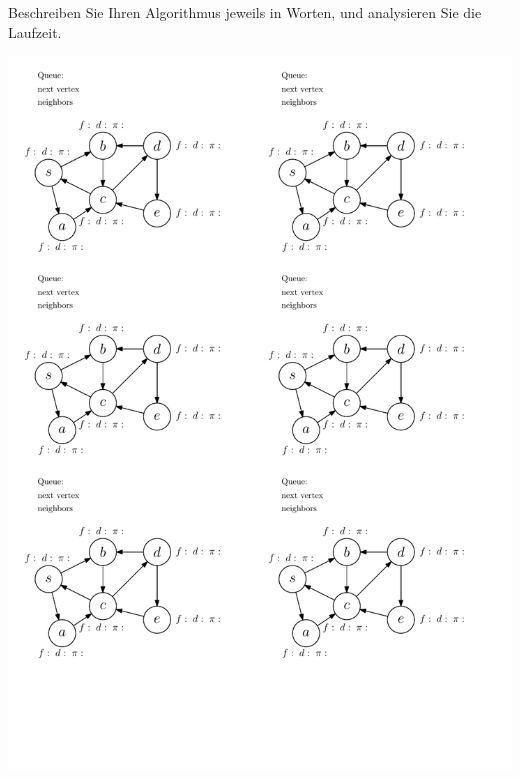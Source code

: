 \documentclass[a4paper,twoside,12pt]{article}
\begin{document}
\begin{description}
\begin{enumerate}
		Beschreiben Sie Ihren Algorithmus jeweils in Worten, und analysieren Sie die Laufzeit.
\end{enumerate}
\newpage
\begin{center}
\includegraphics[scale=0.8]{bfs}
\end{center}
\end{description}
\end{document}
